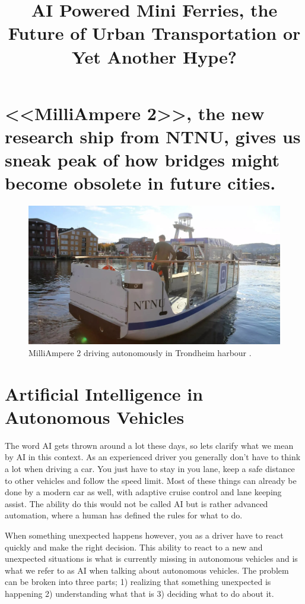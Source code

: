 \documentclass{iopconfser}
\begin{document}
 

\title{AI Powered Mini Ferries, the Future of Urban Transportation or Yet Another Hype?}

\section*{<<MilliAmpere 2>>, the new research ship from NTNU, gives us sneak peak of how bridges might become obsolete in future cities.}

\begin{figure}[H]
    \centering
    \includegraphics[width=\textwidth]{figures/milliampere.jpg}
    \caption{MilliAmpere 2 driving autonomously in Trondheim harbour \cite{hauglandDetSomHar2022}.}
\end{figure}

\section*{Artificial Intelligence in Autonomous Vehicles}
The word AI gets thrown around a lot these days, so lets clarify what we mean by AI in this context.
As an experienced driver you generally don't have to think a lot when driving a car.
You just have to stay in you lane, keep a safe distance to other vehicles and follow the speed limit.
Most of these things can already be done by a modern car as well, with adaptive cruise control and lane keeping assist.
The ability do this would not be called AI but is rather advanced automation, where a human has defined the rules for what to do.

When something unexpected happens however, you as a driver have to react quickly and make the right decision.
This ability to react to a new and unexpected situations is what is currently missing in autonomous vehicles and is what we refer to as AI when talking about autonomous vehicles.
The problem can be broken into three parts; 1) realizing that something unexpected is happening 2) understanding what that is 3) deciding what to do about it.
\end{document}
